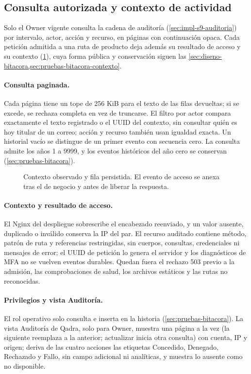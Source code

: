 \subsection{Consulta autorizada y contexto de actividad}\label{sec:impl-bitacora}

Solo el Owner vigente consulta la cadena de auditoría
(\cref{sec:impl-s9-auditoria}) por intervalo, actor, acción y recurso, en páginas
con continuación opaca. Cada petición admitida a una ruta de producto deja
además su resultado de acceso y su contexto (\cref{fig:impl-bitacora-contexto}),
cuya forma pública y conservación siguen las
\cref{sec:diseno-bitacora,sec:pruebas-bitacora-contexto}.

\paragraph{Consulta paginada.} Cada página tiene un tope de 256 KiB para el
texto de las filas devueltas; si se excede, se rechaza completa en vez de
truncarse. El filtro por actor compara exactamente el texto registrado o el UUID
del contexto, sin consultar quién es hoy titular de un correo; acción y recurso
también usan igualdad exacta. Un historial vacío se distingue de un primer
evento con secuencia cero. La consulta admite los años 1 a 9999, y los eventos
históricos del año cero se conservan (\cref{sec:pruebas-bitacora}).

\begin{figure}[!b]
  \centering
  \resizebox{\linewidth}{!}{}
  \caption{Contexto observado y fila persistida. El evento de acceso se anexa
  tras el de negocio y antes de liberar la respuesta.}
  \label{fig:impl-bitacora-contexto}
\end{figure}

\paragraph{Contexto y resultado de acceso.} El Nginx del despliegue sobrescribe el encabezado reenviado, y un valor ausente,
duplicado o inválido conserva la IP del par. El recurso auditado contiene
método, patrón de ruta y referencias restringidas, sin cuerpos, consultas,
credenciales ni mensajes de error; el UUID de petición lo genera el servidor y
los diagnósticos de MFA no se vuelven eventos durables. Quedan fuera el rechazo 503
previo a la admisión, las comprobaciones de salud, los archivos estáticos y las
rutas no reconocidas.

\paragraph{Privilegios y vista Auditoría.} El rol operativo solo consulta e
inserta en la historia (\cref{sec:pruebas-bitacora}). La vista Auditoría de
Qadra, solo para Owner, muestra una página a la vez (la siguiente reemplaza a la
anterior; actualizar inicia otra consulta) con cuenta, IP y origen; deriva de
las cuatro acciones las etiquetas Concedido, Denegado, Rechazado y Fallo, sin
campo adicional ni analíticas, y muestra lo ausente como no disponible.

